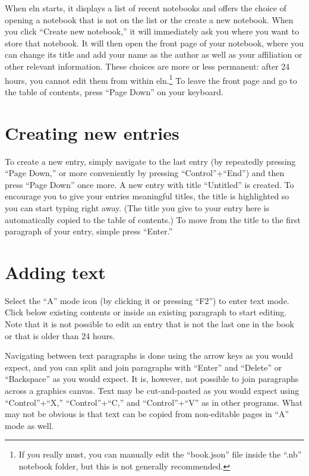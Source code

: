 \documentclass[11pt]{report}
\begin{document}
When eln starts, it displays a list of recent notebooks and offers the
choice of opening a notebook that is not on the list or the create a
new notebook. When you click ``Create new notebook,'' it will
immediately ask you where you want to store that notebook. It will
then open the front page of your notebook, where you can change its
title and add your name as the author as well as your affiliation or
other relevant information. These choices are more or less permanent:
after 24 hours, you cannot edit them from within eln.\footnote{If you
  really must, you can manually edit the ``book.json'' file inside the
  ``.nb'' notebook folder, but this is not generally recommended.} To
leave the front page and go to the table of contents, press ``Page
Down'' on your keyboard.

\section{Creating new entries}

To create a new entry, simply navigate to the last entry (by
repeatedly pressing ``Page Down,'' or more conveniently by pressing
``Control''+``End'') and then press ``Page Down'' once more. A new
entry with title ``Untitled'' is created. To encourage you to give
your entries meaningful titles, the title is highlighted so you can
start typing right away. (The title you give to your entry here is
automatically copied to the table of contents.) To move from the title
to the first paragraph of your entry, simple press ``Enter.''

\section{Adding text}

Select the ``A'' mode icon (by clicking it or pressing ``F2'') to
enter text mode. Click below existing contents or inside an existing
paragraph to start editing. Note that it is not possible to edit an
entry that is not the last one in the book or that is older than 24
hours.

Navigating between text paragraphs is done using the arrow keys as you
would expect, and you can split and join paragraphs with ``Enter'' and
``Delete'' or ``Backspace'' as you would expect. It is, however, not
possible to join paragraphs across a graphics canvas. Text may be
cut-and-pasted as you would expect using ``Control''+``X,''
``Control''+``C,'' and ``Control''+``V'' as in other programs. What
may not be obvious is that text can be copied from non-editable pages
in ``A'' mode as well.
\end{document}
